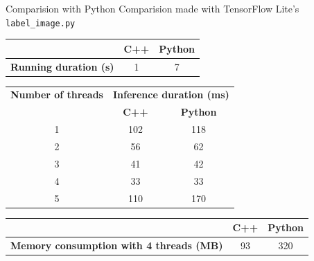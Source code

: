 \begin{frame}{Comparision with Python}
Comparision made with TensorFlow Lite's \texttt{label\_image.py}
  \begin{table}
	\begin{tabular}{c|c|c|}
	  \cline{2-3}
		& \textbf{C++} & \textbf{Python} \\
	  \hline
		\multicolumn{1}{|c|}{\textbf{Running duration (s)}} & 1 & 7 \\
	  \hline
	\end{tabular}
  \end{table}
  \begin{table}
	\begin{tabular}{|c|c|c|}
	  \hline
		\textbf{Number of threads} & \multicolumn{2}{c|}{\textbf{Inference duration (ms)}} \\
	  \cline{2-3}
		& \hspace{0.35cm} \textbf{C++} \hspace{0.35cm} & \textbf{Python} \\
	  \hline
		1 & 102 & 118 \\
	  \hline
		2 & 56 & 62 \\
	  \hline
		3 & 41 & 42 \\
	  \hline
		4 & 33 & 33 \\
	  \hline
		5 & 110 & 170 \\
	  \hline
	\end{tabular}
  \end{table}
  \begin{table}
	\begin{tabular}{c|c|c|}
	  \cline{2-3}
		& \textbf{C++} & \textbf{Python} \\
	  \hline
		\multicolumn{1}{|c|}{\textbf{Memory consumption with 4 threads (MB)}} & 93 & 320 \\
	  \hline
	\end{tabular}
  \end{table}
\end{frame}

